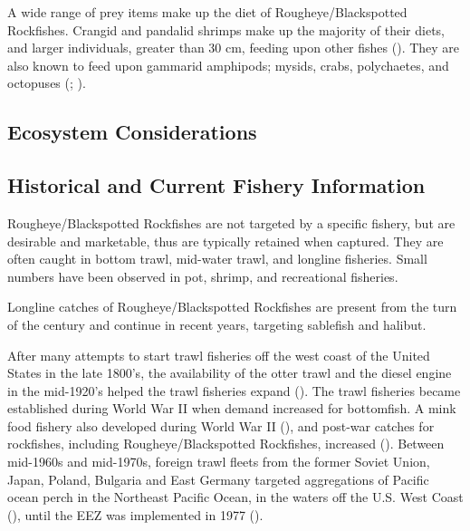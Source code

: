 \documentclass[
]{scrartcl}
\begin{document}
A wide range of prey items make up the diet of Rougheye/Blackspotted
Rockfishes. Crangid and pandalid shrimps make up the majority of their
diets, and larger individuals, greater than 30 cm, feeding upon other
fishes (). They are also
known to feed upon gammarid amphipods; mysids, crabs, polychaetes, and
octopuses (; ).

\subsection{Ecosystem Considerations}\label{ecosystem-considerations}

\subsection{Historical and Current Fishery
Information}\label{historical-and-current-fishery-information}

Rougheye/Blackspotted Rockfishes are not targeted by a specific fishery,
but are desirable and marketable, thus are typically retained when
captured. They are often caught in bottom trawl, mid-water trawl, and
longline fisheries. Small numbers have been observed in pot, shrimp, and
recreational fisheries.

Longline catches of Rougheye/Blackspotted Rockfishes are present from
the turn of the century and continue in recent years, targeting
sablefish and halibut.

After many attempts to start trawl fisheries off the west coast of the
United States in the late 1800's, the availability of the otter trawl
and the diesel engine in the mid-1920's helped the trawl fisheries
expand ().
The trawl fisheries became established during World War II when demand
increased for bottomfish. A mink food fishery also developed during
World War II (),
and post-war catches for rockfishes, including Rougheye/Blackspotted
Rockfishes, increased ().
Between mid-1960s and mid-1970s, foreign trawl fleets from the former
Soviet Union, Japan, Poland, Bulgaria and East Germany targeted
aggregations of Pacific ocean perch in the Northeast Pacific Ocean, in
the waters off the U.S. West Coast
(), until the EEZ was implemented in 1977
().
\end{document}
